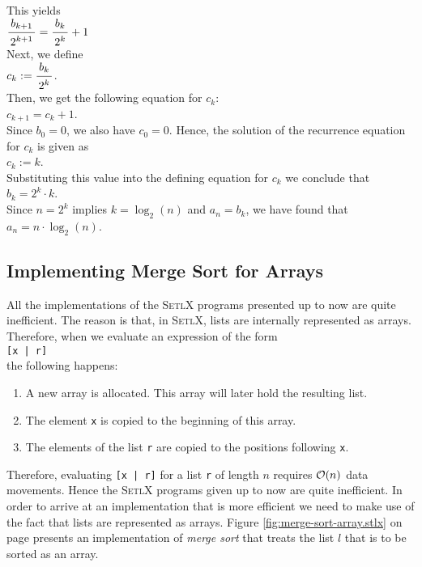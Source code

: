This yields
\\[0.2cm]
\hspace*{1.3cm}
$\bruch{b_{k+1}}{2^{k+1}} = \bruch{b_k}{2^k} + 1$ 
\\[0.2cm]
Next, we define
\\[0.2cm]
\hspace*{1.3cm}
$c_k := \bruch{b_k}{2^k}$.
\\[0.2cm]
Then, we get the following equation for $c_k$:
\\[0.2cm]
\hspace*{1.3cm}
$c_{k+1} = c_k + 1$.
\\[0.2cm]
Since $b_0 = 0$, we also have $c_0 = 0$.  Hence, the solution of the recurrence equation for $c_k$
is given as
\\[0.2cm]
\hspace*{1.3cm}
$c_k := k$.
\\[0.2cm]
Substituting this value into the defining equation for $c_k$ we conclude that
\\[0.2cm]
\hspace*{1.3cm}
$b_k = 2^k \cdot k$.
\\[0.2cm]
Since $n = 2^k$ implies $k = \log_2(n)$ and $a_n = b_k$, we have found that
\\[0.2cm]
\hspace*{1.3cm}
$a_n = n \cdot \log_2(n)$. 


\subsection{Implementing Merge Sort for Arrays}
All the implementations of the \textsc{SetlX} programs presented up to now are quite inefficient.  The
reason is that, in \textsc{SetlX}, lists are internally represented as arrays.  Therefore, when
we evaluate an expression of the form 
\\[0.2cm]
\hspace*{1.3cm}
\texttt{[x | r]}
\\[0.2cm]
the following happens:
\begin{enumerate}
\item A new array is allocated.  This array will later hold the resulting list.
\item The element \texttt{x} is copied to the beginning of this array.
\item The elements of the list \texttt{r} are copied to the positions following \texttt{x}.
\end{enumerate}
Therefore, evaluating \texttt{[x | r]} for a list \texttt{r} of length $n$ requires $\mathcal{O}(n)$ data
movements.  Hence the \textsc{SetlX} programs given up to now are quite inefficient.  In order to arrive at an
implementation that is more efficient we need to make use of the fact that lists are represented as arrays.
Figure \ref{fig:merge-sort-array.stlx} on page \pageref{fig:merge-sort-array.stlx} presents
an implementation of \emph{merge sort} that treats the list $l$ that is to be sorted as an array.



